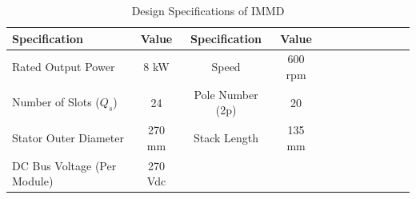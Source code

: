 \documentclass[a4paper,11pt]{article}
\begin{document}
\begin{table}[ht!]
\centering
 \caption{Design Specifications of IMMD}
\label{specs}
\begin{tabularx}{\textwidth}{@{}l*{10}{C}c@{}}

\toprule
Specification  &  Value & Specification  &  Value \\ 
\midrule
Rated Output Power & 8 kW & Speed & 600 rpm\\ 
Number of Slots ($Q_s$) & 24 & Pole Number (2p) & 20 \\
Stator Outer Diameter & 270 mm & Stack Length & 135 mm \\
DC Bus Voltage (Per Module) & 270 Vdc & & \\

\bottomrule
\end{tabularx}
\end{table}
\end{document}
